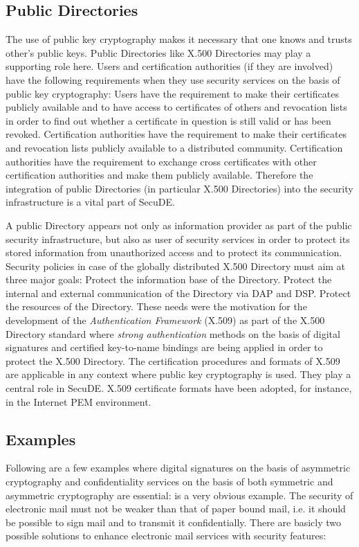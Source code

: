 \subsection{Public Directories}
The use of public key cryptography makes it necessary that one knows 
and trusts other's public keys. Public Directories like X.500 Directories
may play a supporting role here. Users and certification authorities
(if they are involved) have the following requirements when they use security
services on the basis of public key cryptography:
\bi
\m Users have the requirement to make their certificates publicly
available and to have access to certificates of others and revocation lists
in order to find out whether a certificate in question is still valid or
has been revoked.
\m Certification authorities have the requirement to make their certificates and revocation
lists publicly available to a distributed community.
\m Certification authorities have the requirement to exchange cross certificates 
   with other certification authorities and make
   them publicly available.
\ei
Therefore the integration of public Directories (in particular X.500 Directories)
into the security infrastructure is a vital part of SecuDE.

A public Directory appears not only as information provider as part of the public security 
infrastructure, but also as user of security services in order to
protect its stored information from unauthorized access and to protect its 
communication. Security policies in case of the globally distributed X.500 Directory
must aim at three major goals:
\be
\m Protect the information base of the Directory.
\m Protect the internal and external communication of the Directory
   via DAP and DSP.
\m Protect the resources of the Directory.
\ee
These needs were the motivation for the development of the {\em Authentication
Framework} (X.509) as part of the X.500 Directory standard where {\em strong authentication} 
methods on the basis of digital signatures and certified key-to-name bindings
are being applied in order to protect the X.500 Directory. The certification procedures
and formats of X.509 are applicable in any context where public key cryptography is used. 
They play a central role in SecuDE. X.509 certificate
formats have been adopted, for instance, in the Internet PEM environment.

\subsection{Examples}
Following are a few examples where digital signatures on the basis of asymmetric
cryptography and confidentiality services on the basis of both symmetric and asymmetric
cryptography are essential:
\bi
{} is a very obvious example. The security of electronic
   mail must not be weaker than that of paper bound mail, i.e. it should 
   be possible to sign mail and to transmit it confidentially. 
   There are basicly two possible
   solutions to enhance electronic mail services with security features: 

